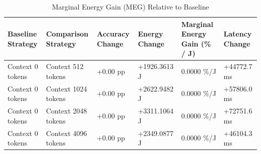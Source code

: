 \begin{table}
\caption{Marginal Energy Gain (MEG) Relative to Baseline}
\label{tab:marginal_energy_gain}
\begin{tabular}{llllll}
\toprule
Baseline Strategy & Comparison Strategy & Accuracy Change & Energy Change & Marginal Energy Gain (\% / J) & Latency Change \\
\midrule
Context 0 tokens & Context 512 tokens & +0.00 pp & +1926.3613 J & 0.0000 \%/J & +44772.7 ms \\
Context 0 tokens & Context 1024 tokens & +0.00 pp & +2622.9482 J & 0.0000 \%/J & +57806.0 ms \\
Context 0 tokens & Context 2048 tokens & +0.00 pp & +3311.1064 J & 0.0000 \%/J & +72751.6 ms \\
Context 0 tokens & Context 4096 tokens & +0.00 pp & +2349.0877 J & 0.0000 \%/J & +46104.3 ms \\
\bottomrule
\end{tabular}
\end{table}
